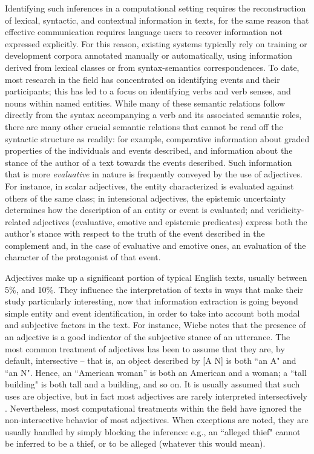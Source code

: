 \documentclass[10pt]{article}
\begin{document}
Identifying such inferences in a computational setting requires the reconstruction of lexical, syntactic, and contextual information in texts, for the same reason that effective communication requires language users to recover information not expressed explicitly. For this reason, existing systems typically rely on training or development corpora annotated manually or automatically, using information derived from lexical classes or from syntax-semantics correspondences.
To date, most research in the field has concentrated on identifying events and their participants; this has led to a focus on identifying verbs and verb senses, and nouns within named entities. While many of these semantic relations follow directly from the syntax accompanying a verb and its associated semantic roles, there are many other crucial semantic relations that cannot be read off the syntactic structure as readily: for example, comparative information about graded properties of the  individuals and events described, and information about the stance of the author of a text towards the events described. Such information that is more \emph{evaluative} in nature is frequently conveyed by the use of adjectives. For instance, in scalar adjectives, the entity characterized is evaluated against others of the same class; in intensional adjectives, the epistemic uncertainty determines how the description of  an entity or event is evaluated; and  veridicity-related adjectives (evaluative, emotive and epistemic predicates)  express both the author's stance with respect to the truth of the event described in the complement and, in the case of evaluative and emotive ones, an evaluation of the character of the protagonist of that event. 

Adjectives make up a significant portion of typical English texts, usually between 5\%, and 10\%. They influence the interpretation of texts in ways that make their study particularly interesting, now that information extraction is going beyond simple entity and event identification, in order to take into account both modal and subjective factors in the text. For instance, Wiebe \cite{wiebe00learningsubjective} notes that the presence of an adjective is a good indicator of the subjective stance of an utterance.
 The most common treatment of adjectives has been to assume that they are, by default, {\sc intersective} -- that is, an object described by [A N] is both ``an A" and ``an N". Hence, an ``American woman'' is both an American and a woman; a ``tall building" is both tall and a building, and so on. 
It is usually assumed that such uses are objective, but in fact most adjectives are rarely interpreted intersectively \cite{giegerich2005associative}. Nevertheless, most computational treatments  within the field have ignored the non-intersective behavior of most adjectives.   When exceptions are noted, they are usually handled by simply blocking the inference: e.g., an ``alleged thief" cannot be inferred to be a thief, or to be alleged (whatever this would mean). 
\end{document}
